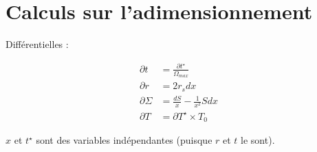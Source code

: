 \section{Calculs sur l’adimensionnement}
\label{app:adimensionnement}

Différentielles :

\begin{align}
    \partial t &= \frac{\partial t^{\star}}{\Omega_{max}} \\
    \partial r &= 2 r_s dx \\
    \partial \Sigma &= \frac{dS}{x} - \frac{1}{x^2} S dx \\
    \partial T &= \partial T^{\star} × T_0
\end{align}

$x$ et $t^\star$ sont des variables indépendantes (puisque $r$ et $t$ le sont).


